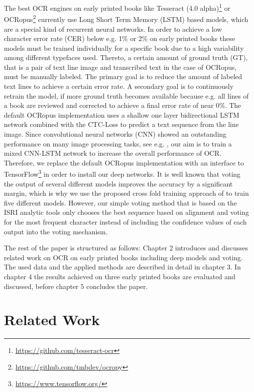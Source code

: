 \documentclass{jlcl}
\begin{document}
The best OCR engines on early printed books like Tesseract (4.0 alpha)\footnote{\url{https://github.com/tesseract-ocr}} or OCRopus\footnote{\url{https://github.com/tmbdev/ocropy}} currently use Long Short Term Memory (LSTM) based models, which are a special kind of recurrent neural networks.
In order to achieve a low character error rate (CER) below e.g. 1\% or 2\% on early printed books these models must be trained individually for a specific book due to a high variability among different typefaces used.
Thereto, a certain amount of ground truth (GT), that is a pair of text line image and transcribed text in the case of OCRopus, must be manually labeled. The primary goal is to reduce the amount of labeled text lines to achieve a certain error rate.
A secondary goal is to continuously retrain the model, if more ground truth becomes available because e.g. all lines of a book are reviewed and corrected to achieve a final error rate of near 0\%.
The default OCRopus implementation uses a shallow one layer bidirectional LSTM network combined with the CTC-Loss to predict a text sequence from the line image.
Since convolutional neural networks (CNN) showed an outstanding performance on many image processing tasks, see e.g. \cite{mane2017surveycnn}, our aim is to train a mixed CNN-LSTM network to increase the overall performance of OCR.
Therefore, we replace the default OCRopus implementation with an interface to TensorFlow\footnote{\url{https://www.tensorflow.org/}} in order to install our deep networks.
It is well known that voting the output of several different models improves the accuracy by a significant margin, which is why we use the proposed cross fold training approach of \cite{reul2017voting} to train five different models.
However, our simple voting method that is based on the ISRI analytic tools \citep{rice1996isri} only chooses the best sequence based on alignment and voting for the most frequent character instead of including the confidence values of each output into the voting mechanism.

The rest of the paper is structured as follows: Chapter 2 introduces and discusses related work on OCR on early printed books including deep models and voting.
The used data and the applied methods are described in detail in chapter 3.
In chapter 4 the results achieved on three early printed books are evaluated and discussed, before chapter 5 concludes the paper.

\section{Related Work}
\end{document}
